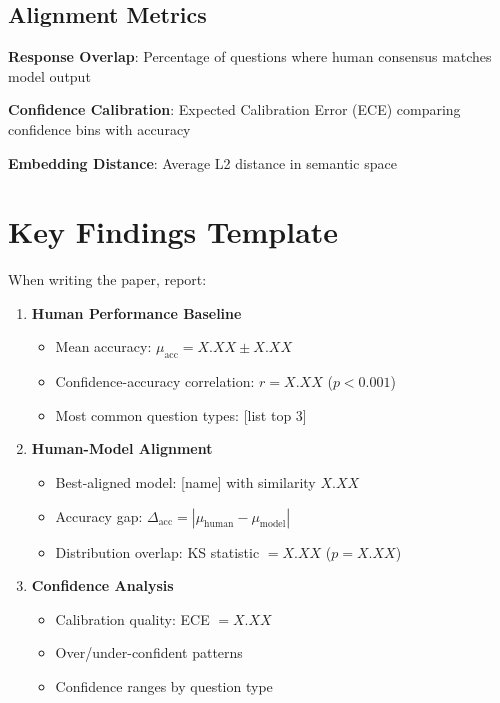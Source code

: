 \documentclass{article}
\begin{document}
\subsection{Alignment Metrics}

\textbf{Response Overlap}: Percentage of questions where human consensus matches model output

\textbf{Confidence Calibration}: Expected Calibration Error (ECE) comparing confidence bins with accuracy

\textbf{Embedding Distance}: Average L2 distance in semantic space

\section{Key Findings Template}

When writing the paper, report:

\begin{enumerate}
    \item \textbf{Human Performance Baseline}
    \begin{itemize}
        \item Mean accuracy: $\mu_{\text{acc}} = X.XX \pm X.XX$
        \item Confidence-accuracy correlation: $r = X.XX$ ($p < 0.001$)
        \item Most common question types: [list top 3]
    \end{itemize}

    \item \textbf{Human-Model Alignment}
    \begin{itemize}
        \item Best-aligned model: [name] with similarity $X.XX$
        \item Accuracy gap: $\Delta_{\text{acc}} = |\mu_{\text{human}} - \mu_{\text{model}}|$
        \item Distribution overlap: KS statistic $= X.XX$ ($p = X.XX$)
    \end{itemize}

    \item \textbf{Confidence Analysis}
    \begin{itemize}
        \item Calibration quality: ECE $= X.XX$
        \item Over/under-confident patterns
        \item Confidence ranges by question type
    \end{itemize}
\end{enumerate}
\end{document}
